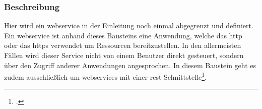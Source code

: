 \subsubsection{Beschreibung}
	\label{subsubsec:beschreibung-app.3.1-webanwendungen-und-webservices}
	Hier wird ein \gls{webservice} in der Einleitung noch einmal abgegrenzt und definiert.
	Ein \gls{webservice} ist anhand dieses Bausteins eine Anwendung,
	welche das \gls{http} oder das \gls{https} verwendet um Ressourcen bereitzustellen.
	In den allermeisten Fällen wird dieser Service nicht von einem Benutzer direkt gesteuert,
	sondern über den Zugriff anderer Anwendungen angesprochen.
	In diesem Baustein geht es zudem ausschließlich um \glspl{webservice}
	mit einer \gls{rest}-Schnittstelle\footcite[Vgl.][APP.3.1 S. 1]{holgerschildt2022}.